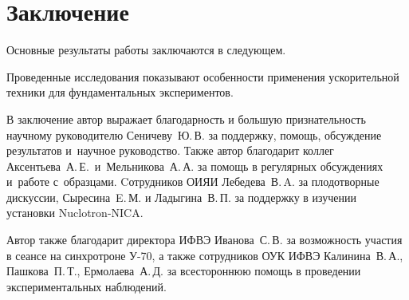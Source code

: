 \chapter*{Заключение}                       %


Основные результаты работы заключаются в следующем.

Проведенные исследования показывают особенности применения ускорительной техники для фундаментальных экспериментов.

В заключение автор
выражает благодарность и большую признательность научному руководителю
Сеничеву~Ю.\,В. за поддержку, помощь, обсуждение результатов и~научное
руководство. 
Также автор благодарит коллег Аксентьева~А.\,Е.~и~Мельникова~А.\,А.
за помощь в регулярных обсуждениях и~работе с~образцами. Cотрудников ОИЯИ Лебедева~В.\,A. за плодотворные дискуссии, Сыресина~E.\,М. и Ладыгина~В.\,П. за поддержку в изучении установки Nuclotron-NICA.

Автор также благодарит директора ИФВЭ Иванова~С.\,В. за возможность участия в сеансе на синхротроне У-70, а также сотрудников ОУК ИФВЭ Калинина~В.\,А., Пашкова~П.\,Т., Ермолаева~А.\,Д. за всестороннюю помощь в проведении экспериментальных наблюдений. 